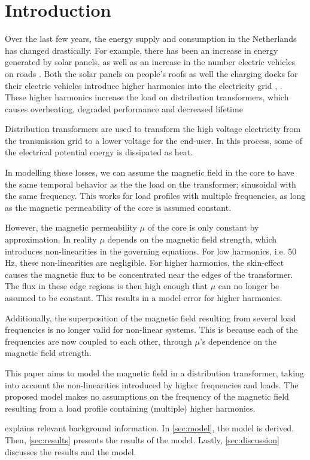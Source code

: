 \chapter{Introduction}

Over the last few years, the energy supply and consumption in the Netherlands has changed drastically. For example, there has been an increase in energy generated by solar panels, as well as an increase in the number electric vehicles on roads \cite{vanDijk2022}. 
Both the solar panels on people's roofs as well the charging docks for their electric vehicles introduce higher harmonics into the electricity grid \cite{energietransitie}, \cite{energieVerbenCons}.
These higher harmonics increase the load on distribution transformers, which causes overheating, degraded performance and decreased lifetime \cite{vanDijk2022}

Distribution transformers are used to transform the high voltage electricity from the transmission grid to a lower voltage for the end-user.
In this process, some of the electrical potential energy is dissipated as heat. 

In modelling these losses, we can assume the magnetic field in the core to have the same temporal behavior as the the load on the transformer; sinusoidal with the same frequency. 
This works for load profiles with multiple frequencies, as long as the magnetic permeability of the core is assumed constant.

However, the magnetic permeability $\mu$ of the core is only constant by approximation. In reality $\mu$ depends on the magnetic field strength, which introduces non-linearities in the governing equations.
For low harmonics, i.e. $50$ Hz, these non-linearities are negligible.
For higher harmonics, the skin-effect causes the magnetic flux to be concentrated near the edges of the transformer. 
The flux in these edge regions is then high enough that $\mu$ can no longer be assumed to be constant. 
This results in a model error for higher harmonics.

Additionally, the superposition of the magnetic field resulting from several load frequencies is no longer valid for non-linear systems.
This is because each of the frequencies are now coupled to each other, through $\mu$'s dependence on the magnetic field strength.

This paper aims to model the magnetic field in a distribution transformer, taking into account the non-linearities introduced by higher frequencies and loads.
The proposed model makes no assumptions on the frequency of the magnetic field resulting from a load profile containing (multiple) higher harmonics.

 explains relevant background information. 
In \cref{sec:model}, the model is derived. 
Then, \cref{sec:results} presents the results of the model. 
Lastly, \cref{sec:discussion} discusses the results and the model.

